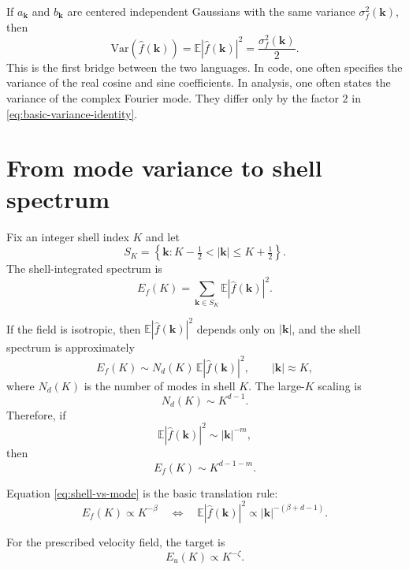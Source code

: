 \documentclass[11pt]{article}
\newcommand{\E}{\mathbb{E}}
\newcommand{\Var}{\mathrm{Var}}
\newcommand{\kk}{\mathbf{k}}
\begin{document}
If $a_{\kk}$ and $b_{\kk}$ are centered independent Gaussians with the same variance $\sigma_f^2(\kk)$, then
\begin{equation}
\Var\!\left(\hat{f}(\kk)\right)
= \E |\hat{f}(\kk)|^2
= \frac{\sigma_f^2(\kk)}{2}.
\label{eq:basic-variance-identity}
\end{equation}
This is the first bridge between the two languages. In code, one often specifies the variance of the real cosine and sine coefficients. In analysis, one often states the variance of the complex Fourier mode. They differ only by the factor $2$ in \eqref{eq:basic-variance-identity}.

\section{From mode variance to shell spectrum}
Fix an integer shell index $K$ and let
\begin{equation}
S_K = \left\{\kk : K-\tfrac12 < |\kk| \le K+\tfrac12\right\}.
\end{equation}
The shell-integrated spectrum is
\begin{equation}
E_f(K)=\sum_{\kk\in S_K}\E |\hat{f}(\kk)|^2.
\label{eq:shell-spectrum}
\end{equation}

If the field is isotropic, then $\E |\hat{f}(\kk)|^2$ depends only on $|\kk|$, and the shell spectrum is approximately
\begin{equation}
E_f(K)\sim N_d(K)\,\E |\hat{f}(\kk)|^2,
\qquad |\kk|\approx K,
\end{equation}
where $N_d(K)$ is the number of modes in shell $K$. The large-$K$ scaling is
\begin{equation}
N_d(K)\sim K^{d-1}.
\end{equation}
Therefore, if
\begin{equation}
\E |\hat{f}(\kk)|^2 \sim |\kk|^{-m},
\end{equation}
then
\begin{equation}
E_f(K)\sim K^{d-1-m}.
\label{eq:shell-vs-mode}
\end{equation}

Equation \eqref{eq:shell-vs-mode} is the basic translation rule:
\begin{equation}
\boxed{
E_f(K)\propto K^{-\beta}
\quad\Longleftrightarrow\quad
\E |\hat{f}(\kk)|^2 \propto |\kk|^{-(\beta+d-1)}.
}
\label{eq:translation-rule}
\end{equation}

For the prescribed velocity field, the target is
\begin{equation}
E_u(K)\propto K^{-\zeta}.
\label{eq:velocity-target}
\end{equation}
\end{document}
